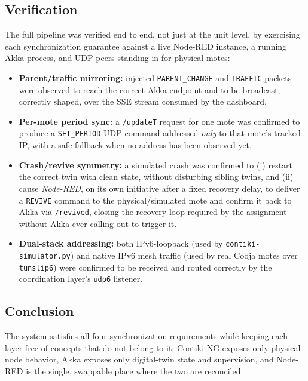 \subsection*{Verification}
The full pipeline was verified end to end, not just at the unit level, by exercising each
synchronization guarantee against a live Node-RED instance, a running Akka process, and
UDP peers standing in for physical motes:
\begin{itemize}
\item \textbf{Parent/traffic mirroring:} injected \texttt{PARENT\_CHANGE} and \texttt{TRAFFIC}
  packets were observed to reach the correct Akka endpoint and to be broadcast, correctly
  shaped, over the SSE stream consumed by the dashboard.
\item \textbf{Per-mote period sync:} a \texttt{/updateT} request for one mote was confirmed to
  produce a \texttt{SET\_PERIOD} UDP command addressed \emph{only} to that mote's tracked IP,
  with a safe fallback when no address has been observed yet.
\item \textbf{Crash/revive symmetry:} a simulated crash was confirmed to (i) restart the
  correct twin with clean state, without disturbing sibling twins, and (ii) cause
  \emph{Node-RED}, on its own initiative after a fixed recovery delay, to deliver a
  \texttt{REVIVE} command to the physical/simulated mote and confirm it back to Akka via
  \texttt{/revived}, closing the recovery loop required by the assignment without Akka ever
  calling out to trigger it.
\item \textbf{Dual-stack addressing:} both IPv6-loopback (used by \texttt{contiki-simulator.py})
  and native IPv6 mesh traffic (used by real Cooja motes over \texttt{tunslip6}) were confirmed
  to be received and routed correctly by the coordination layer's \texttt{udp6} listener.
\end{itemize}

\subsection*{Conclusion}
The system satisfies all four synchronization requirements while keeping each layer free of
concepts that do not belong to it: Contiki-NG exposes only physical-node behavior, Akka
exposes only digital-twin state and supervision, and Node-RED is the single, swappable place
where the two are reconciled.
